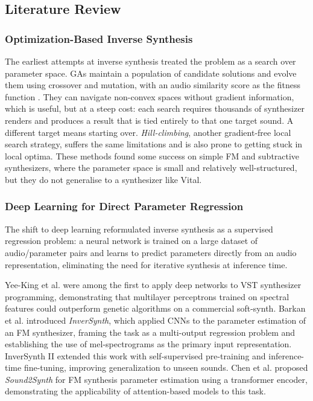 \subsection{Literature Review}

\subsubsection{Optimization-Based Inverse Synthesis}

The earliest attempts at inverse synthesis treated the problem as a search over parameter space. GAs maintain a population of candidate solutions and evolve them using crossover and mutation, with an audio similarity score as the fitness function \cite{walker2007audiosynthesis}. They can navigate non-convex spaces without gradient information, which is useful, but at a steep cost: each search requires thousands of synthesizer renders and produces a result that is tied entirely to that one target sound. A different target means starting over. \textit{Hill-climbing}, another gradient-free local search strategy, suffers the same limitations and is also prone to getting stuck in local optima. These methods found some success on simple FM and subtractive synthesizers, where the parameter space is small and relatively well-structured, but they do not generalise to a synthesizer like Vital.

\subsubsection{Deep Learning for Direct Parameter Regression}

The shift to deep learning reformulated inverse synthesis as a supervised regression problem: a neural network is trained on a large dataset of audio/parameter pairs and learns to predict parameters directly from an audio representation, eliminating the need for iterative synthesis at inference time.

\par \vspace{0.5cm}

\noindent Yee-King et al. \cite{yeeking2018automatic} were among the first to apply deep networks to VST synthesizer programming, demonstrating that multilayer perceptrons trained on spectral features could outperform genetic algorithms on a commercial soft-synth. Barkan et al. \cite{barkan2019inversynth} introduced \textit{InverSynth}, which applied CNNs to the parameter estimation of an FM synthesizer, framing the task as a multi-output regression problem and establishing the use of mel-spectrograms as the primary input representation. InverSynth II \cite{barkan2023inversynth2} extended this work with self-supervised pre-training and inference-time fine-tuning, improving generalization to unseen sounds. Chen et al. \cite{chen2022sound2synth} proposed \textit{Sound2Synth} for FM synthesis parameter estimation using a transformer encoder, demonstrating the applicability of attention-based models to this task.

